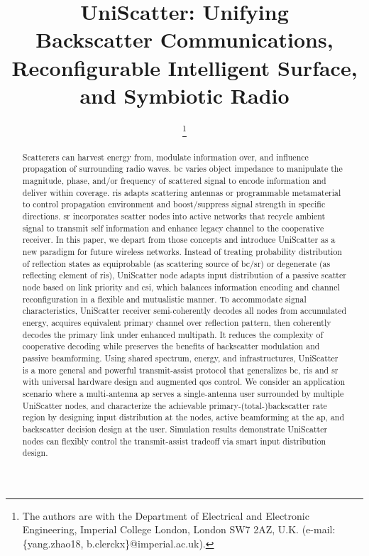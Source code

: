 \documentclass[journal]{IEEEtran}
\begin{document}
\title{UniScatter: Unifying\\Backscatter Communications, Reconfigurable Intelligent Surface, and Symbiotic Radio}
\author{
	\thanks{
		The authors are with the Department of Electrical and Electronic Engineering, Imperial College London, London SW7 2AZ, U.K. (e-mail: \{yang.zhao18, b.clerckx\}@imperial.ac.uk).
	}
}
\maketitle

\begin{abstract}
	Scatterers can harvest energy from, modulate information over, and influence propagation of surrounding radio waves.
	\gls{bc} varies object impedance to manipulate the magnitude, phase, and/or frequency of scattered signal to encode information and deliver within coverage.
	\gls{ris} adapts scattering antennas or programmable metamaterial to control propagation environment and boost/suppress signal strength in specific directions.
	\gls{sr} incorporates scatter nodes into active networks that recycle ambient signal to transmit self information and enhance legacy channel to the cooperative receiver.
	In this paper, we depart from those concepts and introduce UniScatter as a new paradigm for future wireless networks.
	Instead of treating probability distribution of reflection states as equiprobable (as scattering source of \gls{bc}/\gls{sr}) or degenerate (as reflecting element of \gls{ris}), UniScatter node adapts input distribution of a passive scatter node based on link priority and \gls{csi}, which balances information encoding and channel reconfiguration in a flexible and mutualistic manner.
	To accommodate signal characteristics, UniScatter receiver semi-coherently decodes all nodes from accumulated energy, acquires equivalent primary channel over reflection pattern, then coherently decodes the primary link under enhanced multipath.
	It reduces the complexity of cooperative decoding while preserves the benefits of backscatter modulation and passive beamforming.
	Using shared spectrum, energy, and infrastructures, UniScatter is a more general and powerful transmit-assist protocol that generalizes \gls{bc}, \gls{ris} and \gls{sr} with universal hardware design and augmented \gls{qos} control.
	We consider an application scenario where a multi-antenna \gls{ap} serves a single-antenna user surrounded by multiple UniScatter nodes, and characterize the achievable primary-(total-)backscatter rate region by designing input distribution at the nodes, active beamforming at the \gls{ap}, and backscatter decision design at the user.
	Simulation results demonstrate UniScatter nodes can flexibly control the transmit-assist tradeoff via smart input distribution design.
\end{abstract}
\end{document}
